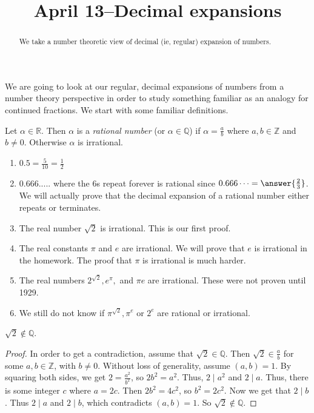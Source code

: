 \documentclass{ximera}
\title{April 13--Decimal expansions}
\begin{document}
  
\begin{abstract}  We take a number theoretic view of decimal (ie, regular) expansion of numbers.
\end{abstract}
\maketitle  

 We are going to look at our regular, decimal expansions of numbers from a number theory perspective in order to study something familiar as an analogy for continued fractions.  We start with some familiar definitions.
 
\begin{definition}
 Let $\alpha\in\mathbb{R}$. Then $\alpha$ is a \emph{rational number} (or $\alpha\in\mathbb{Q}$) if $\alpha=\frac{a}{b}$ where $a,b\in\mathbb{Z}$ and $b\neq 0$. Otherwise $\alpha$ is irrational.
\end{definition}

\begin{example}
\begin{enumerate}
 \item $0.5=\frac{5}{10}=\frac{1}{2}$ 
 \item $0.666.....$ where the $6$s repeat forever is rational since $0.666\dots=\answer{\frac{2}{3}}$. We will actually prove that the decimal expansion of a rational number either repeats or terminates.
 \item The real number $\sqrt{2}$ is irrational. This is our first proof.
 \item The real constants $\pi$ and $e$ are irrational. We will prove that $e$ is irrational in the homework. The proof that $\pi$ is irrational is much harder.
 \item The real numbers $2^{\sqrt{2}}, e^\pi,$ and $\pi e$ are irrational. These were not proven until 1929.
 \item We still do not know if $\pi^{\sqrt{2}}, \pi^e$ or $2^e$ are rational or irrational.
\end{enumerate}
\end{example}

\begin{theorem}
 $\sqrt{2}\not\in\mathbb{Q}$.
\end{theorem}
\begin{proof}
 In order to get a contradiction, assume that $\sqrt{2}\in\mathbb{Q}$. Then $\sqrt{2}\in\frac{a}{b}$ for some $a,b\in\mathbb{Z}$, with $b\neq 0$. Without loss of generality, assume $(a,b)=1$. By squaring both sides, we get $2=\frac{a^2}{b^2}$, so $2b^2=a^2$. Thus, $2\mid a^2$ and $2\mid a$. Thus, there is some integer $c$ where $a=2c$. Then $2b^2=4c^2$, so $b^2=2c^2$.  Now we get that $2\mid b$. Thus $2\mid a$ and $2\mid b$, which contradicts $(a,b)=1$. So $\sqrt{2}\not\in\mathbb{Q}$.
\end{proof}
\end{document}
